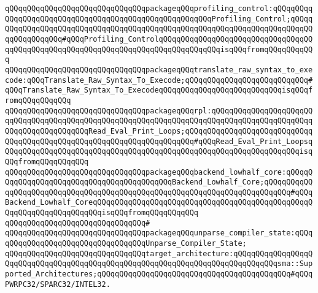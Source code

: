 \verb|qQQqqQQqqQQqqQQqqQQqqQQqqQQqqQQqpackageqQQqprofiling_control:qQQqqQQqqQQqqQQqqQQqqQQqqQQqqQQqqQQqqQQqqQQqqQQqqQQqqQQqProfiling_Control;qQQqqQQqqQQqqQQqqQQqqQQqqQQqqQQqqQQqqQQqqQQqqQQqqQQqqQQqqQQqqQQqqQQqqQQqqQQqqQQqqQQqqQQq#qQQqProfiling_ControlqQQqqQQqqQQqqQQqqQQqqQQqqQQqqQQqqQQqqQQqqQQqqQQqqQQqqQQqqQQqqQQqqQQqqQQqqQQqqQQqqQQqisqQQqfromqQQqqQQqqQQq|\newline
\verb|qQQqqQQqqQQqqQQqqQQqqQQqqQQqqQQqpackageqQQqtranslate_raw_syntax_to_execode:qQQqTranslate_Raw_Syntax_To_Execode;qQQqqQQqqQQqqQQqqQQqqQQqqQQq#qQQqTranslate_Raw_Syntax_To_ExecodeqQQqqQQqqQQqqQQqqQQqqQQqqQQqisqQQqfromqQQqqQQqqQQq|\newline
\verb|qQQqqQQqqQQqqQQqqQQqqQQqqQQqqQQqpackageqQQqrpl:qQQqqQQqqQQqqQQqqQQqqQQqqQQqqQQqqQQqqQQqqQQqqQQqqQQqqQQqqQQqqQQqqQQqqQQqqQQqqQQqqQQqqQQqqQQqqQQqqQQqqQQqqQQqqQQqRead_Eval_Print_Loops;qQQqqQQqqQQqqQQqqQQqqQQqqQQqqQQqqQQqqQQqqQQqqQQqqQQqqQQqqQQqqQQqqQQqqQQq#qQQqRead_Eval_Print_LoopsqQQqqQQqqQQqqQQqqQQqqQQqqQQqqQQqqQQqqQQqqQQqqQQqqQQqqQQqqQQqqQQqqQQqisqQQqfromqQQqqQQqqQQq|\newline
\verb|qQQqqQQqqQQqqQQqqQQqqQQqqQQqqQQqpackageqQQqbackend_lowhalf_core:qQQqqQQqqQQqqQQqqQQqqQQqqQQqqQQqqQQqqQQqqQQqBackend_Lowhalf_Core;qQQqqQQqqQQqqQQqqQQqqQQqqQQqqQQqqQQqqQQqqQQqqQQqqQQqqQQqqQQqqQQqqQQqqQQqqQQq#qQQqBackend_Lowhalf_CoreqQQqqQQqqQQqqQQqqQQqqQQqqQQqqQQqqQQqqQQqqQQqqQQqqQQqqQQqqQQqqQQqqQQqqQQqisqQQqfromqQQqqQQqqQQq|\newline
\verb|qQQqqQQqqQQqqQQqqQQqqQQqqQQqqQQq#|\newline
\verb|qQQqqQQqqQQqqQQqqQQqqQQqqQQqqQQqpackageqQQqunparse_compiler_state:qQQqqQQqqQQqqQQqqQQqqQQqqQQqqQQqqQQqUnparse_Compiler_State;|\newline
\verb|qQQqqQQqqQQqqQQqqQQqqQQqqQQqqQQqtarget_architecture:qQQqqQQqqQQqqQQqqQQqqQQqqQQqqQQqqQQqqQQqqQQqqQQqqQQqqQQqqQQqqQQqqQQqqQQqqQQqqQQqsma::Supported_Architectures;qQQqqQQqqQQqqQQqqQQqqQQqqQQqqQQqqQQqqQQqqQQq#qQQqPWRPC32/SPARC32/INTEL32.|\newline

